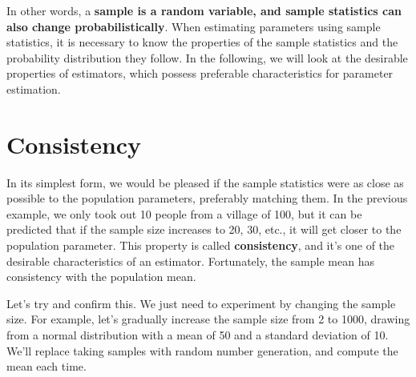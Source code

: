 \documentclass[
  a4paper,
]{book}
\begin{document}
In other words, a \textbf{sample is a random variable, and sample
statistics can also change probabilistically}. When estimating
parameters using sample statistics, it is necessary to know the
properties of the sample statistics and the probability distribution
they follow. In the following, we will look at the desirable properties
of estimators, which possess preferable characteristics for parameter
estimation.

\section{Consistency}\label{consistency}

In its simplest form, we would be pleased if the sample statistics were
as close as possible to the population parameters, preferably matching
them. In the previous example, we only took out 10 people from a village
of 100, but it can be predicted that if the sample size increases to 20,
30, etc., it will get closer to the population parameter. This property
is called \textbf{consistency}, and it's one of the desirable
characteristics of an estimator. Fortunately, the sample mean has
consistency with the population mean.

Let's try and confirm this. We just need to experiment by changing the
sample size. For example, let's gradually increase the sample size from
2 to 1000, drawing from a normal distribution with a mean of 50 and a
standard deviation of 10. We'll replace taking samples with random
number generation, and compute the mean each time.
\end{document}
